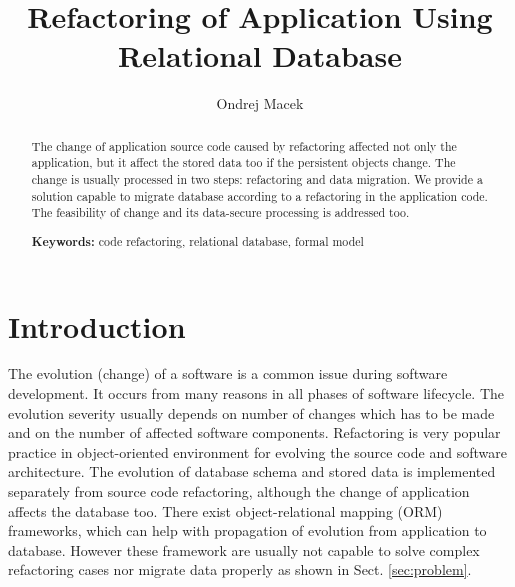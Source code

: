 \documentclass[runningheads]{comsis}
\title{Refactoring of Application Using Relational Database}
\author{Ondrej Macek\inst{1}}
\institute{Czech Technical University in Prague\\
  Karlovo namesti 13 \\
121 35 Praha 2, Czech Republic\\
  \email{macekond@fel.cvut.cz}}
\begin{document}
\maketitle

\begin{abstract}
The change of application source code caused by refactoring affected not only the application, but it affect the stored data too if the persistent objects change. The change is usually processed in two steps: refactoring and data migration. We provide a solution capable to migrate database according to a refactoring in the application code. The feasibility of change and its data-secure processing is addressed too.

\vspace{6pt}\textbf{Keywords:} code refactoring, relational database, formal model
\end{abstract}


\section{Introduction}
\label{sec:intro}
The evolution (change) of a software is a common issue during software development. It occurs from many reasons in all phases of software lifecycle. The evolution severity usually depends on number of changes which has to be made and on the number of affected software components. Refactoring \cite{Fowler:Refactoring} is very popular practice in object-oriented environment for evolving the source code and software architecture. The evolution of database schema and stored data is implemented separately from  source code refactoring, although the change of application affects the database too. There exist object-relational mapping (ORM) frameworks, which can help with propagation of evolution from application to database. However these framework are usually not capable to solve complex refactoring cases nor migrate data properly as shown in Sect. \ref{sec:problem}.

\end{document}
